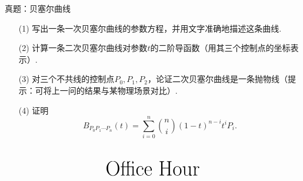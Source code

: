 \documentclass[]{beamer}
\begin{document}
\begin{frame}{真题：贝塞尔曲线}
    \begin{enumerate}
        \item[(1)] 写出一条一次贝塞尔曲线的参数方程，并用文字准确地描述这条曲线.
        \item[(2)] 计算一条二次贝塞尔曲线对参数$t$的二阶导函数（用其三个控制点的坐标表示）.
        \item[(3)] 对三个不共线的控制点$P_0,P_1,P_2$，论证二次贝塞尔曲线是一条抛物线（提示：可将上一问的结果与某物理场景对比）.
        \item[(4)] 证明
        \[
        B_{P_0P_1\cdots P_n}(t)=\sum_{i=0}^{n}{n\choose i}(1-t)^{n-i} t^i P_i.
        \]
    \end{enumerate}
    
\end{frame}

\section*{}
\begin{frame}
\vspace{25pt}
\[
\text{\Huge Office Hour}
\]
\end{frame}
\end{document}
